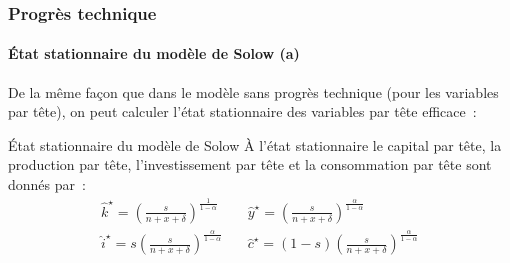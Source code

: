 \documentclass[10pt,notheorems]{beamer}
\theoremstyle{plain}
\theoremstyle{definition} %
\begin{document}
\begin{frame}
\end{frame}


\begin{frame}
  \frametitle{Progrès technique}
  \framesubtitle{État stationnaire du modèle de Solow (a)}

  \bigskip

  De la même façon que dans le modèle sans progrès technique (pour les variables par tête), on peut calculer l'état stationnaire des variables par tête efficace~:

  \bigskip

  \begin{block}{État stationnaire du modèle de Solow}
    À l'état stationnaire le capital par tête, la production par tête,
    l'investissement par tête et la consommation par tête sont donnés
    par~:
    \begin{eqnarray*}
      \hat k^{\star} = \left(\frac{s}{n+x+\delta}\right)^{\frac{1}{1-\alpha}}  &\quad \hat y^{\star} = \left(\frac{s}{n+x+\delta}\right)^{\frac{\alpha}{1-\alpha}}\\
      \hat i^{\star} =  s\left(\frac{s}{n+x+\delta}\right)^{\frac{\alpha}{1-\alpha}}  &\quad \hat c^{\star} = (1-s)\left(\frac{s}{n+x+\delta}\right)^{\frac{\alpha}{1-\alpha}}
    \end{eqnarray*}
  \end{block}

\end{frame}
\end{document}

